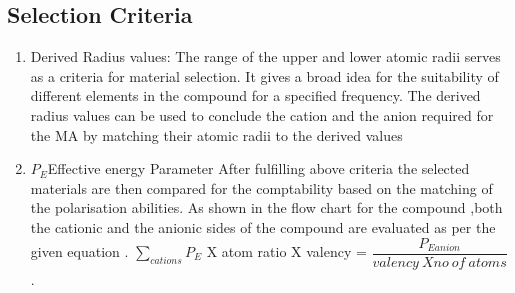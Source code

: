 \documentclass[journal]{IEEEtran}
\begin{document}
\begin{multicols}{2}







\subsection{Selection Criteria}

\begin{enumerate}
	\item{Derived Radius values: 
		The range of the upper and lower atomic radii serves as a criteria for material selection. It gives a broad idea for the suitability of different elements in the compound for a specified frequency. The derived radius values can be used to conclude the cation and the anion required for the MA by matching their atomic radii to the derived values}
	\item {$P_E $Effective energy  Parameter 
		After fulfilling above criteria the selected materials are then compared for the comptability based on the matching of the polarisation abilities. As shown in the flow chart for the compound ,both the cationic and the anionic sides of the compound are evaluated as per the given equation .
		\newline
		${\sum_{cations}} P_E $ X atom ratio X valency = $ \dfrac{P_{Eanion}}{valency \ X no \  of    \ atoms}$.}
		

\end{enumerate}
\end{multicols}
\end{document}
